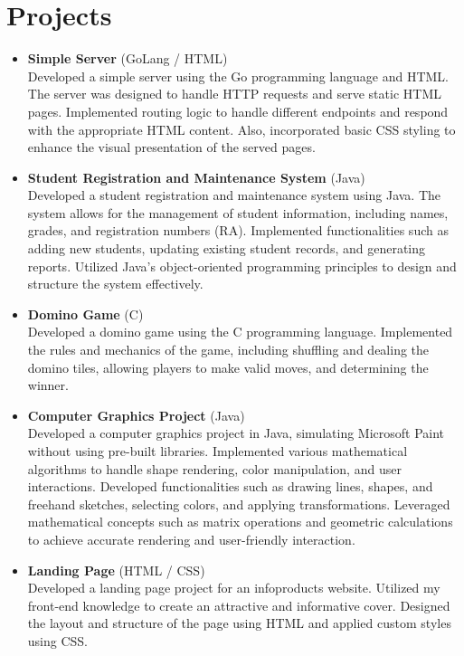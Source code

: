 \documentclass[a4paper,10pt]{article}
\begin{document}
\section*{Projects}
\begin{itemize}[leftmargin=*]
    \item \textbf{Simple Server} (GoLang / HTML) \\
    Developed a simple server using the Go programming language and HTML. The server was designed to handle HTTP requests and serve static HTML pages. Implemented routing logic to handle different endpoints and respond with the appropriate HTML content. Also, incorporated basic CSS styling to enhance the visual presentation of the served pages.
    
    \item \textbf{Student Registration and Maintenance System} (Java) \\
    Developed a student registration and maintenance system using Java. The system allows for the management of student information, including names, grades, and registration numbers (RA). Implemented functionalities such as adding new students, updating existing student records, and generating reports. Utilized Java's object-oriented programming principles to design and structure the system effectively. 
    
    \item \textbf{Domino Game} (C) \\
    Developed a domino game using the C programming language. Implemented the rules and mechanics of the game, including shuffling and dealing the domino tiles, allowing players to make valid moves, and determining the winner. 
    
    \item \textbf{Computer Graphics Project} (Java) \\
    Developed a computer graphics project in Java, simulating Microsoft Paint without using pre-built libraries. Implemented various mathematical algorithms to handle shape rendering, color manipulation, and user interactions. Developed functionalities such as drawing lines, shapes, and freehand sketches, selecting colors, and applying transformations. Leveraged mathematical concepts such as matrix operations and geometric calculations to achieve accurate rendering and user-friendly interaction.
    
    \item \textbf{Landing Page} (HTML / CSS) \\
    Developed a landing page project for an infoproducts website. Utilized my front-end knowledge to create an attractive and informative cover. Designed the layout and structure of the page using HTML and applied custom styles using CSS.
    

\end{itemize}
\end{document}
